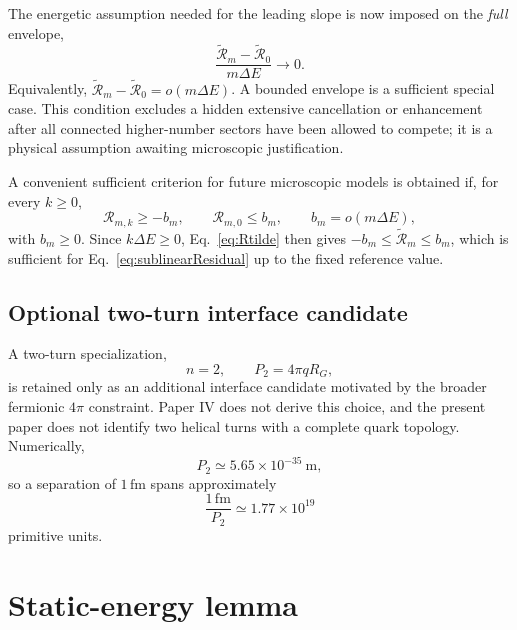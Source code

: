 \documentclass[10pt]{article}
\begin{document}
The energetic assumption needed for the leading slope is now imposed on the \emph{full} envelope,
\begin{equation}
\boxed{
\frac{\widetilde{\mathcal R}_m-\widetilde{\mathcal R}_0}
{m\Delta E}\longrightarrow0.
}
\label{eq:sublinearResidual}
\end{equation}
Equivalently, $\widetilde{\mathcal R}_m-\widetilde{\mathcal R}_0=o(m\Delta E)$. A bounded envelope is a sufficient special case. This condition excludes a hidden extensive cancellation or enhancement after all connected higher-number sectors have been allowed to compete; it is a physical assumption awaiting microscopic justification.

A convenient sufficient criterion for future microscopic models is obtained if, for every $k\ge0$,
\begin{equation}
\mathcal R_{m,k}\ge -b_m,
\qquad
\mathcal R_{m,0}\le b_m,
\qquad
b_m=o(m\Delta E),
\label{eq:residualSufficient}
\end{equation}
with $b_m\ge0$. Since $k\Delta E\ge0$, Eq.~\eqref{eq:Rtilde} then gives $-b_m\le\widetilde{\mathcal R}_m\le b_m$, which is sufficient for Eq.~\eqref{eq:sublinearResidual} up to the fixed reference value.

\subsection{Optional two-turn interface candidate}

A two-turn specialization,
\begin{equation}
n=2,\qquad P_2=4\pi qR_G,
\label{eq:P2}
\end{equation}
is retained only as an additional interface candidate motivated by the broader fermionic $4\pi$ constraint. Paper IV does not derive this choice, and the present paper does not identify two helical turns with a complete quark topology. Numerically,
\begin{equation}
P_2\simeq5.65\times10^{-35}\ \mathrm{m},
\label{eq:P2num}
\end{equation}
so a separation of $1\,\mathrm{fm}$ spans approximately
\begin{equation}
\frac{1\,\mathrm{fm}}{P_2}\simeq1.77\times10^{19}
\label{eq:hugeN}
\end{equation}
primitive units.

\section{Static-energy lemma}
\label{sec:linear}
\end{document}
